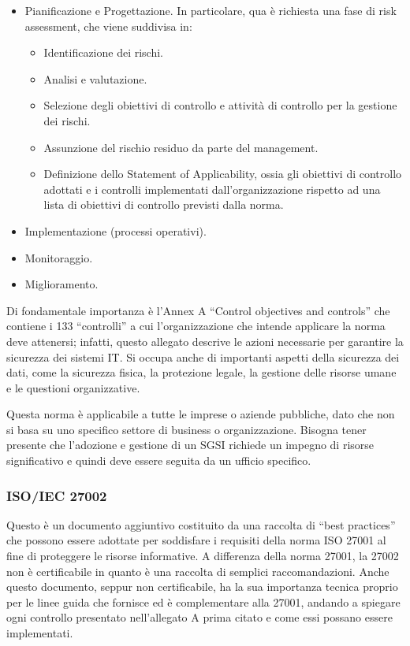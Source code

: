      \begin{itemize}
        \item Pianificazione e Progettazione. In particolare, qua è richiesta una fase di risk assessment, che viene suddivisa in:
        \begin{itemize}
            \item Identificazione dei rischi.
            \item Analisi e valutazione.
            \item Selezione degli obiettivi di controllo e attività di controllo per la gestione dei rischi.
            \item Assunzione del rischio residuo da parte del management.
            \item Definizione dello Statement of Applicability, ossia gli obiettivi di controllo adottati e i controlli implementati dall'organizzazione rispetto ad una lista di obiettivi di controllo previsti dalla norma. 
        \end{itemize}
        \item Implementazione (processi operativi).
        \item Monitoraggio.
        \item Miglioramento.
     \end{itemize}
     
    Di fondamentale importanza è l'Annex A “Control objectives and controls” che contiene i 133 “controlli” a cui l'organizzazione che intende applicare la norma deve attenersi; infatti, questo allegato descrive le azioni necessarie per garantire la sicurezza dei sistemi IT. Si occupa anche di importanti aspetti della sicurezza dei dati, come la sicurezza fisica, la protezione legale, la gestione delle risorse umane e le questioni organizzative.
         
     Questa norma è applicabile a tutte le imprese o aziende pubbliche, dato che non si basa su uno specifico settore di business o organizzazione. Bisogna tener presente che l'adozione e gestione di un SGSI richiede un impegno di risorse significativo e quindi deve essere seguita da un ufficio specifico.
     
        \subsubsection{ISO/IEC 27002}
        Questo è un documento aggiuntivo costituito da una raccolta di “best practices” che possono essere adottate per soddisfare i requisiti della norma ISO 27001 al fine di proteggere le risorse informative. A differenza della norma 27001, la 27002 non è certificabile in quanto è una raccolta di semplici raccomandazioni. Anche questo documento, seppur non certificabile, ha la sua importanza tecnica proprio per le linee guida che fornisce ed è complementare alla 27001, andando a spiegare ogni controllo presentato nell'allegato A prima citato e come essi possano essere implementati.

